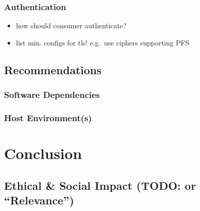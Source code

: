 \documentclass[12pt,english,a4paper,titlepage,cleardoublepage=empty,dottedtoc]{report}
\begin{document}
\subsection{Authentication}\label{authentication-1}

\begin{itemize}
\item
  how should consumer authenticate?
\item
  list min. configs for tls! e.g.~use ciphers supporting PFS
\end{itemize}

\section{Recommendations}\label{recommendations}

\subsection{Software Dependencies}\label{software-dependencies}

\subsection{Host Environment(s)}\label{host-environments}

\chapter{Conclusion}\label{conclusion}

\section{\texorpdfstring{Ethical \& Social Impact (TODO: or
``Relevance'')}{Ethical \& Social Impact (TODO: or Relevance)}}\label{ethical-social-impact-todo-or-relevance}
\end{document}
